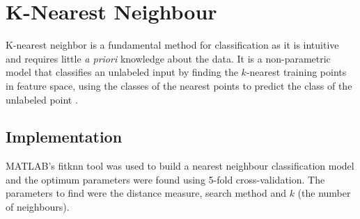 \section{K-Nearest Neighbour}

K-nearest neighbor is a fundamental method for classification as it is intuitive and requires little \textit{a priori} knowledge about the data. It is a non-parametric model that classifies an unlabeled input by finding the $k$-nearest training points in feature space, using the classes of the nearest points to predict the class of the unlabeled point \cite{Peterson}. 

\subsection{Implementation}

MATLAB's fitknn tool was used to build a nearest neighbour classification model and the optimum parameters were found using 5-fold cross-validation. The parameters to find were the distance measure, search method and $k$ (the number of neighbours). 

